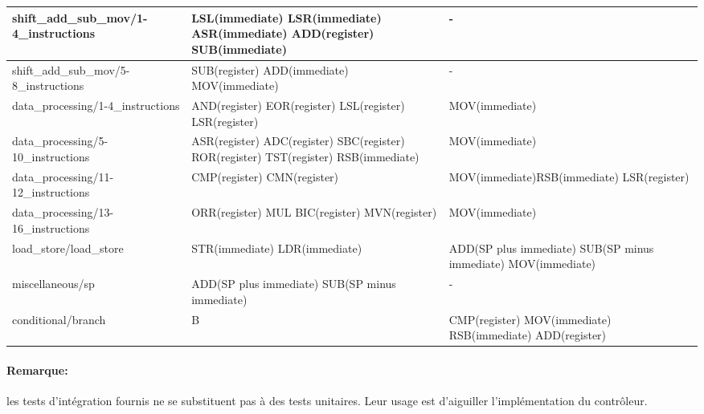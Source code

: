 \begin{tabularx}{\textwidth}{|l|X|X|}
shift{\_}add{\_}sub{\_}mov/1-4{\_}instructions		&  LSL(immediate) \newline LSR(immediate) \newline ASR(immediate) \newline ADD(register) \newline SUB(immediate) & -\\
\hline
shift{\_}add{\_}sub{\_}mov/5-8{\_}instructions			&  SUB(register) \newline ADD(immediate) \newline MOV(immediate) & -\\
\hline
data{\_}processing/1-4{\_}instructions			&  AND(register) \newline EOR(register) \newline LSL(register) \newline LSR(register) & MOV(immediate)\\
\hline
data{\_}processing/5-10{\_}instructions			&  ASR(register) \newline ADC(register) \newline SBC(register) \newline ROR(register) \newline TST(register) \newline RSB(immediate) & MOV(immediate)\\
\hline
data{\_}processing/11-12{\_}instructions			&  CMP(register) \newline CMN(register)  & MOV(immediate)\newline RSB(immediate) \newline LSR(register)\\
\hline
data{\_}processing/13-16{\_}instructions			&  ORR(register) \newline MUL \newline BIC(register) \newline MVN(register) & MOV(immediate)\\
\hline
load{\_}store/load{\_}store		&  STR(immediate) \newline LDR(immediate) & ADD(SP plus immediate) \newline SUB(SP minus immediate) \newline MOV(immediate)\\
\hline
miscellaneous/sp		&  ADD(SP plus immediate) \newline SUB(SP minus immediate) & -\\
\hline
conditional/branch		&  B & CMP(register) \newline MOV(immediate) \newline RSB(immediate) \newline ADD(register)\\
\hline
\end{tabularx}

\paragraph{Remarque:} les tests d'intégration fournis ne se substituent pas à des tests unitaires. Leur usage est d'aiguiller l'implémentation du contrôleur.